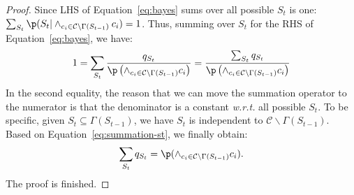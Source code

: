 \begin{lemma}
\begin{proof}
Since LHS of Equation~\eqref{eq:bayes} sums over all possible $S_t$ is one: $\sum_{S_t}\p(S_t |\wedge_{c_i \in \mathcal{C}\backslash \Gamma(S_{t-1})}c_i)=1$. Thus, summing over $S_t$ for the RHS of Equation~\eqref{eq:bayes}, we have:
\begin{equation} \label{eq:summation-st} 
\begin{aligned}
1=\sum_{S_t}\frac{q_{S_t} }{\p \left(\wedge_{c_i \in \mathcal{C}\backslash \Gamma(S_{t-1})}c_i\right) }=\frac{\sum_{S_t}q_{S_t} }{\p \left(\wedge_{c_i \in \mathcal{C}\backslash \Gamma(S_{t-1})}c_i\right) }
\end{aligned}
\end{equation}
In the second equality, the reason that we can move the summation operator to  the numerator is that the denominator is a constant \textit{w.r.t.} all possible $S_t$. To be specific, given $S_t\subseteq\Gamma(S_{t-1})$, we have  $S_t$ is independent to $\mathcal{C}\backslash \Gamma(S_{t-1})$.
Based on Equation~\eqref{eq:summation-st}, we finally obtain:
\begin{equation*}
\sum_{S_t}q_{S_t}=\p(\wedge_{c_i \in \mathcal{C}\backslash \Gamma(S_{t-1})}c_i).
\end{equation*}
The proof  is finished. 
\end{proof}
\end{lemma}



